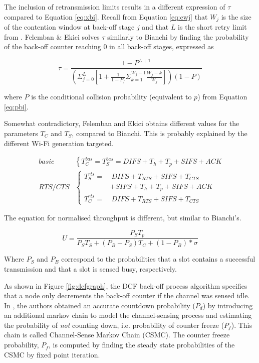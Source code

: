 The inclusion of retransmission limits results in a different expression of
$\tau$ compared to Equation \ref{eq:xbi}. Recall from Equation \ref{eq:cwj}
that $W_j$ is the size of the contention window at back-off stage $j$ and that
$L$ is the short retry limit from \cite{654749}. Felemban \& Ekici solves
$\tau$ similarly to Bianchi \cite{bianchi} by finding the probability of the
back-off counter reaching 0 in all back-off stages, expressed as

\begin{equation} \label{eq:xfe}
	\tau = \frac{1-P^{L+1}}{
		(\Sigma^L_{j=0}
			[1 + \frac{1}{1-P_f}
				\Sigma^{W_j-1}_{k=1} \frac{W_j-k}{W_j}
			]
		)(1-P)}
\end{equation}

where $P$ is the conditional collision probability (equivalent to $p$) from
Equation \ref{eq:pbi}.

Somewhat contradictory, Felemban and Ekici obtains different values for the
parameters $T_C$ and $T_S$, compared to Bianchi. This is probably explained by
the different Wi-Fi generation targeted.

\begin{align}  \label{eq:tfe}
	\mathit{basic} & \left\{
	        T^{bas}_{C} = T^{bas}_{S} = \mathit{DIFS} + T_h + T_p + \mathit{SIFS} + \mathit{ACK}
	\right. \\
	\mathit{RTS/CTS} & \left\{
	    \begin{aligned}
	        T^{rts}_{S} = & ~ \mathit{DIFS} + T_\mathit{RTS} + \mathit{SIFS} + T_\mathit{CTS} \\ & + \mathit{SIFS} + T_h + T_p + \mathit{SIFS} + \mathit{ACK}  \\
	        T^{rts}_{C} = & ~ \mathit{DIFS} + T_\mathit{RTS} + \mathit{SIFS} + T_\mathit{CTS}
	    \end{aligned}
	\right.
\end{align}

The equation for normalised throughput is different, but similar to Bianchi's.

\begin{equation} \label{eq:ufe}
	U = \frac{P_S T_p}{P_S T_S + (P_B - P_S)T_C + (1 - P_B) * \sigma}
\end{equation}

Where $P_S$ and $P_B$ correspond to the probabilities that a slot contains a
successful transmission and that a slot is sensed busy, respectively.

As shown in Figure \ref{fig:dcfgraph}, the DCF back-off process algorithm
specifies that a node only decrements the back-off counter if the channel was
sensed idle. In \cite{felemban}, the authors obtained an accurate countdown
probability ($P_d$) by introducing an additional markov chain to model the
channel-sensing process and estimating the probability of \emph{not} counting
down, i.e. probability of counter freeze ($P_f$). This chain is called
Channel-Sense Markov Chain (CSMC). The counter freeze probability, $P_f$, is
computed by finding the steady state probabilities of the CSMC by fixed point
iteration.

